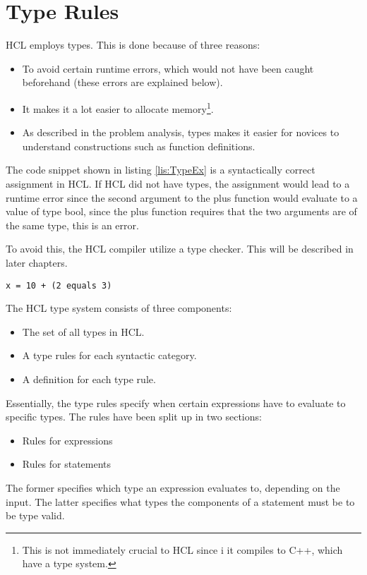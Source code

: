 \section{Type Rules}
HCL employs types.
This is done because of three reasons:
\begin{itemize}
	\item To avoid certain runtime errors, which would not have been caught beforehand (these errors are explained below).
	\item It makes it a lot easier to allocate memory\footnote{This is not immediately crucial to HCL since i it compiles to C++, which have a type system.
	}.
	\item As described in the problem analysis, types makes it easier for novices to understand constructions such as function definitions.
\end{itemize}
The code snippet shown in listing \ref{lis:TypeEx} is a syntactically correct assignment in HCL.
If HCL did not have types, the assignment would lead to a runtime error since the second argument to the plus function would evaluate to a value of type bool, since the plus function requires that the two arguments are of the same type, this is an error.

To avoid this, the HCL compiler utilize a type checker.
This will be described in later chapters.
\begin{lstlisting}[language=HCL,label=lis:TypeEx,caption=An HCL expression,firstnumber=9]
x = 10 + (2 equals 3)
\end{lstlisting}

The HCL type system consists of three components:
\begin{itemize}
	\item The set of all types in HCL.
	\item A type rules for each syntactic category.
	\item A definition for each type rule.
\end{itemize}

Essentially, the type rules specify when certain expressions have to evaluate to specific types.
The rules have been split up in two sections:
\begin{itemize}
	\item Rules for expressions
	\item Rules for statements
\end{itemize}
The former specifies which type an expression evaluates to, depending on the input.
The latter specifies what types the components of a statement must be to be type valid.

